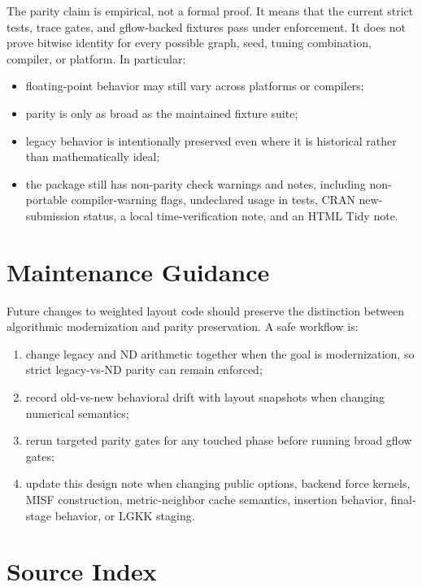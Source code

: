 \documentclass[11pt]{article}
\newcommand{\code}[1]{\texttt{\detokenize{#1}}}
\newcommand{\nd}{ND}
\begin{document}
The parity claim is empirical, not a formal proof. It means that the current
strict tests, trace gates, and gflow-backed fixtures pass under enforcement.
It does not prove bitwise identity for every possible graph, seed, tuning
combination, compiler, or platform. In particular:

\begin{itemize}[leftmargin=*]
  \item floating-point behavior may still vary across platforms or compilers;
  \item parity is only as broad as the maintained fixture suite;
  \item legacy behavior is intentionally preserved even where it is historical
  rather than mathematically ideal;
  \item the package still has non-parity check warnings and notes, including
  non-portable compiler-warning flags, undeclared \code{geometry} usage in
  tests, CRAN new-submission status, a local time-verification note, and an
  HTML Tidy note.
\end{itemize}

\section{Maintenance Guidance}

Future changes to weighted layout code should preserve the distinction between
algorithmic modernization and parity preservation. A safe workflow is:

\begin{enumerate}[leftmargin=*]
  \item change legacy and \nd{} arithmetic together when the goal is
  modernization, so strict legacy-vs-\nd{} parity can remain enforced;
  \item record old-vs-new behavioral drift with layout snapshots when changing
  numerical semantics;
  \item rerun targeted parity gates for any touched phase before running broad
  gflow gates;
  \item update this design note when changing public options, backend force
  kernels, MISF construction, metric-neighbor cache semantics, insertion
  behavior, final-stage behavior, or LGKK staging.
\end{enumerate}

\section{Source Index}
\end{document}
